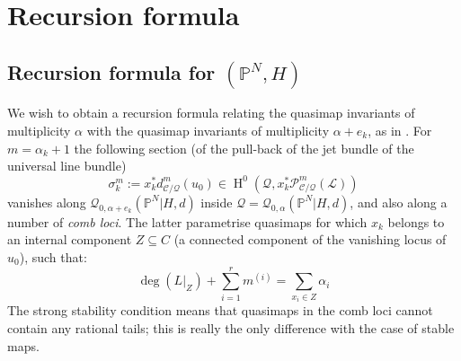 \documentclass[10pt]{amsart}
\newcommand{\Q}[4]{\mathcal{Q}_{#1,#2}(#3,#4)}
\newcommand{\PP}{\mathbb P}
\newcommand{\HH}{\operatorname{H}}
\newcommand{\om}[1]{\mathcal{#1}}
\theoremstyle{definition}
\theoremstyle{definition}
\newcommand{\ilemph}[1]{\emph{#1}}
\begin{document}
\section{Recursion formula}\label{section recursion}
\subsection{Recursion formula for $(\PP^N,H)$} \label{Section recursion for PN}
\label{Subsection recursion formula for PN}
We wish to obtain a recursion formula relating the quasimap invariants of multiplicity $\alpha$ with the quasimap invariants of multiplicity $\alpha + e_k$, as in \cite[Theorem 2.6]{Ga}. For $m = \alpha_k + 1$ the following section (of the pull-back of the jet bundle of the universal line bundle)
\[
\sigma^m_k := x_k^*d^m_{\mathcal C/\om{Q}}(u_0)\in \HH^0(\om{Q},x_k^*\mathcal P^m_{\mathcal C/\mathcal Q}(\mathcal L))
\]
vanishes along $\Q{0}{\alpha+e_k}{\PP^N|H}{d}$ inside $\om{Q} = \Q{0}{\alpha}{\PP^N|H}{d}$, and also along a number of \ilemph{comb loci}.  The latter parametrise quasimaps for which $x_k$ belongs to an internal component $Z \subseteq C$ (a connected component of the vanishing locus of $u_0$), such that:
\begin{equation*}\deg(L|_{Z})+\sum_{i=1}^r m^{(i)}=\sum_{x_i\in Z}\alpha_i \end{equation*}
The strong stability condition means that quasimaps in the comb loci cannot contain any rational tails; this is really the only difference with the case of stable maps.
\end{document}
